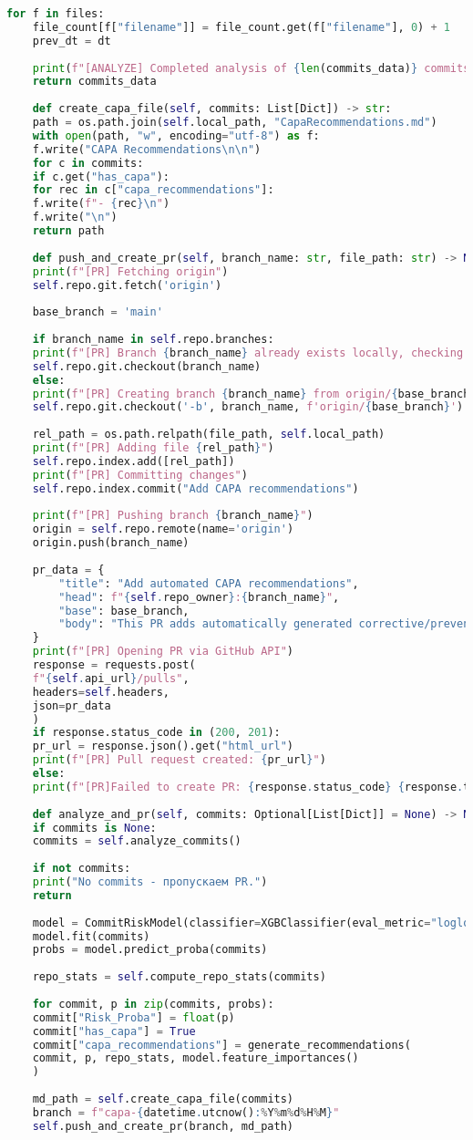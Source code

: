 \begin{lstlisting}[language=Python, caption={{ \texttt{repository\_analysis.py}}}]
	for f in files:
	file_count[f["filename"]] = file_count.get(f["filename"], 0) + 1
	prev_dt = dt
	
	print(f"[ANALYZE] Completed analysis of {len(commits_data)} commits.")
	return commits_data
	
	def create_capa_file(self, commits: List[Dict]) -> str:
	path = os.path.join(self.local_path, "CapaRecommendations.md")
	with open(path, "w", encoding="utf-8") as f:
	f.write("CAPA Recommendations\n\n")
	for c in commits:
	if c.get("has_capa"):
	for rec in c["capa_recommendations"]:
	f.write(f"- {rec}\n")
	f.write("\n")
	return path
	
	def push_and_create_pr(self, branch_name: str, file_path: str) -> None:
	print(f"[PR] Fetching origin")
	self.repo.git.fetch('origin')
	
	base_branch = 'main'
	
	if branch_name in self.repo.branches:
	print(f"[PR] Branch {branch_name} already exists locally, checking out.")
	self.repo.git.checkout(branch_name)
	else:
	print(f"[PR] Creating branch {branch_name} from origin/{base_branch}")
	self.repo.git.checkout('-b', branch_name, f'origin/{base_branch}')
	
	rel_path = os.path.relpath(file_path, self.local_path)
	print(f"[PR] Adding file {rel_path}")
	self.repo.index.add([rel_path])
	print(f"[PR] Committing changes")
	self.repo.index.commit("Add CAPA recommendations")
	
	print(f"[PR] Pushing branch {branch_name}")
	origin = self.repo.remote(name='origin')
	origin.push(branch_name)
	
	pr_data = {
		"title": "Add automated CAPA recommendations",
		"head": f"{self.repo_owner}:{branch_name}",
		"base": base_branch,
		"body": "This PR adds automatically generated corrective/preventive actions."
	}
	print(f"[PR] Opening PR via GitHub API")
	response = requests.post(
	f"{self.api_url}/pulls",
	headers=self.headers,
	json=pr_data
	)
	if response.status_code in (200, 201):
	pr_url = response.json().get("html_url")
	print(f"[PR] Pull request created: {pr_url}")
	else:
	print(f"[PR]Failed to create PR: {response.status_code} {response.text}")
	
	def analyze_and_pr(self, commits: Optional[List[Dict]] = None) -> None:
	if commits is None:
	commits = self.analyze_commits()
	
	if not commits:
	print("No commits - пропускаем PR.")
	return
	
	model = CommitRiskModel(classifier=XGBClassifier(eval_metric="logloss"))
	model.fit(commits)
	probs = model.predict_proba(commits)
	
	repo_stats = self.compute_repo_stats(commits)
	
	for commit, p in zip(commits, probs):
	commit["Risk_Proba"] = float(p)
	commit["has_capa"] = True
	commit["capa_recommendations"] = generate_recommendations(
	commit, p, repo_stats, model.feature_importances()
	)
	
	md_path = self.create_capa_file(commits)
	branch = f"capa-{datetime.utcnow():%Y%m%d%H%M}"
	self.push_and_create_pr(branch, md_path)
\end{lstlisting}

